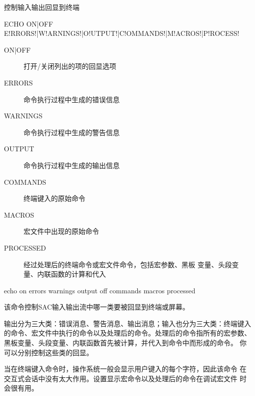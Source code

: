 \label{cmd:echo}

控制输入输出回显到终端

\begin{SACSTX}
ECHO ON|OFF E!RRORS!|W!ARNINGS!|O!UTPUT!|C!OMMANDS!|M!ACROS!|P!ROCESS!
\end{SACSTX}

\begin{description}
\item [ON|OFF] 打开/关闭列出的项的回显选项
\item [ERRORS] 命令执行过程中生成的错误信息
\item [WARNINGS] 命令执行过程中生成的警告信息
\item [OUTPUT] 命令执行过程中生成的输出信息
\item [COMMANDS] 终端键入的原始命令
\item [MACROS] 宏文件中出现的原始命令
\item [PROCESSED] 经过处理后的终端命令或宏文件命令，包括宏参数、黑板
    变量、头段变量、内联函数的计算和代入
\end{description}

\begin{SACDFT}
echo on errors warnings output off commands macros processed
\end{SACDFT}

该命令控制SAC输入输出流中哪一类要被回显到终端或屏幕。

输出分为三大类：错误消息、警告消息、输出消息；输入也分为三大类：终端键入
的命令、宏文件中执行的命令以及处理后的命令。处理后的命令指所有的宏参数、
黑板变量、头段变量、内联函数首先被计算，并代入到命令中而形成的命令。
你可以分别控制这些类的回显。

当在终端键入命令时，操作系统一般会显示用户键入的每个字符，因此该命令
在交互式会话中没有太大作用。设置显示宏命令以及处理后的命令在调试宏文件
时会很有用。
